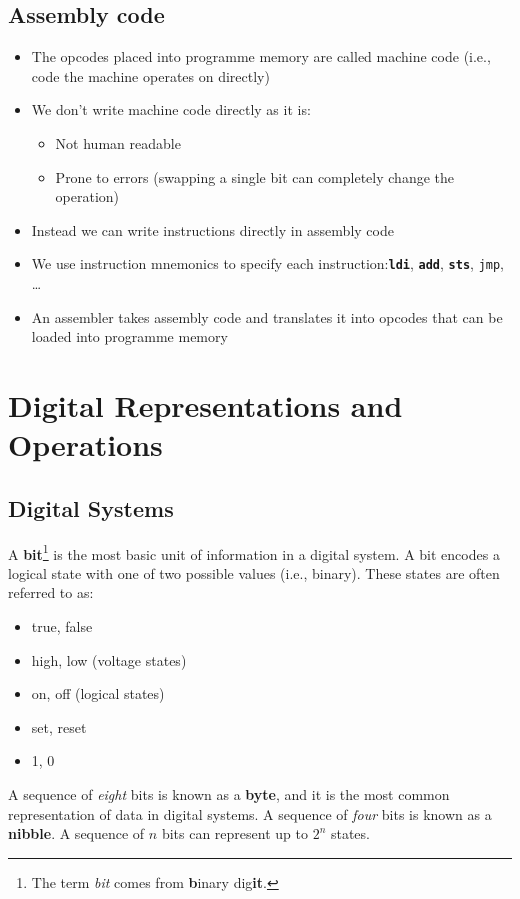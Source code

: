 \documentclass{report}
\newcommand{\keywordinline}[1]{\textcolor[rgb]{0.00,0.50,0.00}{\textbf{\texttt{#1}}}}
\begin{document}
\section{Assembly code}
\begin{itemize}
    \item The opcodes placed into programme memory are called
          machine code (i.e., code the machine operates on directly)
    \item We don't write machine code directly as it is:
          \begin{itemize}
              \item Not human readable
              \item Prone to errors (swapping a single bit can completely change the operation)
          \end{itemize}
    \item Instead we can write instructions directly in assembly code
    \item We use instruction mnemonics to specify each instruction:\@ \keywordinline{ldi}, \keywordinline{add}, \keywordinline{sts}, \texttt{jmp}, \dots
    \item An assembler takes assembly code and translates it into opcodes that can
          be loaded into programme memory
\end{itemize}
\chapter{Digital Representations and Operations}
\section{Digital Systems}
A \textbf{bit}\footnote{The term \textit{bit} comes from \textbf{b}inary dig\textbf{it}.}
is the most basic unit of information in a digital system.
A bit encodes a logical state with one of two possible values (i.e., binary).
These states are often referred to as:
\begin{itemize}
    \item true, false
    \item high, low (voltage states)
    \item on, off (logical states)
    \item set, reset
    \item 1, 0
\end{itemize}
A sequence of \textit{eight} bits is known as a \textbf{byte}, and it is the most
common representation of data in digital systems.
A sequence of \textit{four} bits is known as a \textbf{nibble}.
A sequence of \(n\) bits can represent up to \(2^n\) states.
\end{document}
